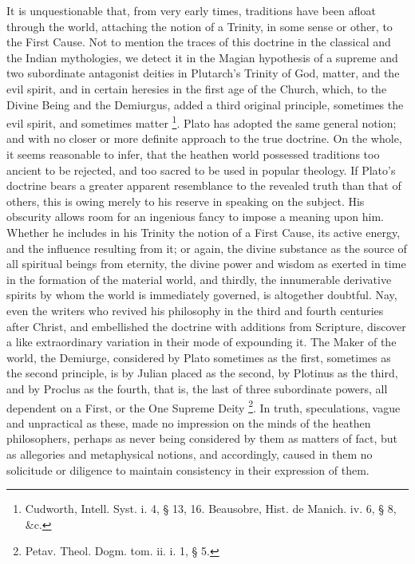 It is unquestionable that, from very early times, traditions have
been afloat through the world, attaching the notion of a Trinity, in
some sense or other, to the First Cause. Not to mention the traces of
this doctrine in the classical and the Indian mythologies, we detect
it in the Magian hypothesis of a supreme and two subordinate
antagonist deities in Plutarch's Trinity of God, matter, and the evil
spirit, and in certain heresies in the first age of the Church, which,
to the Divine Being and the Demiurgus, added a third original
principle, sometimes the evil spirit, and sometimes matter \footnote{Cudworth, Intell. Syst. i. 4, § 13, 16.
Beausobre, Hist. de Manich. iv. 6, § 8, \&c.}. Plato has adopted the same general notion; and with no closer
or more definite approach to the true doctrine. On the whole, it seems
reasonable to infer, that the heathen world possessed traditions too
ancient to be rejected, and too sacred to be used in popular
theology. If Plato's doctrine bears a greater apparent resemblance to
the revealed truth than that of others, this is owing merely to his
reserve in speaking on the subject. His obscurity allows room for an
ingenious fancy to impose a meaning upon him. Whether he includes in
his Trinity the notion of a First Cause, its active energy, and the
influence resulting from it; or again, the divine substance as the
source of all spiritual beings from eternity, the divine power and
wisdom as exerted in time in the formation of the material world, and
thirdly, the innumerable derivative spirits by whom the world is
immediately governed, is altogether doubtful. Nay, even the writers
who revived his philosophy in the third and fourth centuries after
Christ, and embellished the doctrine with additions from Scripture,
discover a like extraordinary variation in their mode of expounding
it. The Maker of the world, the Demiurge, considered by Plato
sometimes as the first, sometimes as the second principle, is by
Julian placed as the second, by Plotinus as the third, and by Proclus
as the fourth, that is, the last of three subordinate powers, all
dependent on a First, or the One Supreme Deity \footnote{Petav. Theol. Dogm. tom. ii. i. 1, § 5.}. In truth, speculations, vague and unpractical as these, made
no impression on the minds of the heathen philosophers, perhaps as
never being considered by them as matters of fact, but as allegories
and metaphysical notions, and accordingly, caused in them no
solicitude or diligence to maintain consistency in their expression of
them.

